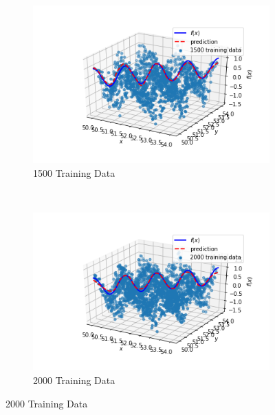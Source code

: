 \documentclass{article}
\begin{document}
\begin{figure}[htbp]
\begin{subfigure}{0.45\textwidth}
        \includegraphics[width=\textwidth]{figures/1500TrainingData}
        \caption{1500 Training Data}
    \end{subfigure}
~ %
    \begin{subfigure}{0.45\textwidth}
        \includegraphics[width=\textwidth]{figures/2000TrainingData}
        \caption{2000 Training Data}
    \end{subfigure}
\end{figure}
\end{document}
